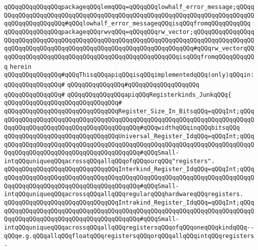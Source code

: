 \verb|qQQqqQQqqQQqqQQqpackageqQQqlemqQQq=qQQqqQQqlowhalf_error_message;qQQqqQQqqQQqqQQqqQQqqQQqqQQqqQQqqQQqqQQqqQQqqQQqqQQqqQQqqQQqqQQqqQQqqQQqqQQqqQQqqQQqqQQqqQQq#qQQqlowhalf_error_messageqQQqisqQQqfromqQQqqQQqqQQq|\newline
\verb|qQQqqQQqqQQqqQQqpackageqQQqrwvqQQq=qQQqqQQqrw_vector;qQQqqQQqqQQqqQQqqQQqqQQqqQQqqQQqqQQqqQQqqQQqqQQqqQQqqQQqqQQqqQQqqQQqqQQqqQQqqQQqqQQqqQQqqQQqqQQqqQQqqQQqqQQqqQQqqQQqqQQqqQQqqQQqqQQqqQQqqQQq#qQQqrw_vectorqQQqqQQqqQQqqQQqqQQqqQQqqQQqqQQqqQQqqQQqqQQqqQQqqQQqisqQQqfromqQQqqQQqqQQq|\newline
\verb|herein|\newline
\newline
\verb|qQQqqQQqqQQqqQQq#qQQqThisqQQqapiqQQqisqQQqimplementedqQQq(only)qQQqin:|\newline
\verb|qQQqqQQqqQQqqQQq#|\newline
\verb|qQQqqQQqqQQqqQQq#qQQqqQQqqQQqqQQqqQQq|\newline
\verb|qQQqqQQqqQQqqQQq#|\newline
\verb|qQQqqQQqqQQqqQQqapiqQQqRegisterkinds_JunkqQQq{|\newline
\verb|qQQqqQQqqQQqqQQqqQQqqQQqqQQqqQQq#|\newline
\verb|qQQqqQQqqQQqqQQqqQQqqQQqqQQqqQQqRegister_Size_In_BitsqQQq=qQQqInt;qQQqqQQqqQQqqQQqqQQqqQQqqQQqqQQqqQQqqQQqqQQqqQQqqQQqqQQqqQQqqQQqqQQqqQQqqQQqqQQqqQQqqQQqqQQqqQQqqQQqqQQqqQQqqQQq#qQQqwidthqQQqinqQQqbitsqQQq|\newline
\verb|qQQqqQQqqQQqqQQqqQQqqQQqqQQqqQQqUniversal_Register_IdqQQq=qQQqInt;qQQqqQQqqQQqqQQqqQQqqQQqqQQqqQQqqQQqqQQqqQQqqQQqqQQqqQQqqQQqqQQqqQQqqQQqqQQqqQQqqQQqqQQqqQQqqQQqqQQqqQQqqQQqqQQq#qQQqSmall-intqQQquniqueqQQqacrossqQQqallqQQqofqQQqourqQQq"registers".|\newline
\verb|qQQqqQQqqQQqqQQqqQQqqQQqqQQqqQQqInterkind_Register_IdqQQq=qQQqInt;qQQqqQQqqQQqqQQqqQQqqQQqqQQqqQQqqQQqqQQqqQQqqQQqqQQqqQQqqQQqqQQqqQQqqQQqqQQqqQQqqQQqqQQqqQQqqQQqqQQqqQQqqQQqqQQq#qQQqSmall-intqQQquniqueqQQqacrossqQQqallqQQqregularqQQqhardwareqQQqregisters.|\newline
\verb|qQQqqQQqqQQqqQQqqQQqqQQqqQQqqQQqIntrakind_Register_IdqQQq=qQQqInt;qQQqqQQqqQQqqQQqqQQqqQQqqQQqqQQqqQQqqQQqqQQqqQQqqQQqqQQqqQQqqQQqqQQqqQQqqQQqqQQqqQQqqQQqqQQqqQQqqQQqqQQqqQQqqQQq#qQQqSmall-intqQQquniqueqQQqacrossqQQqallqQQqregistersqQQqofqQQqoneqQQqkindqQQq--qQQqe.g.qQQqallqQQqfloatqQQqregistersqQQqorqQQqallqQQqintqQQqregisters.|\newline
